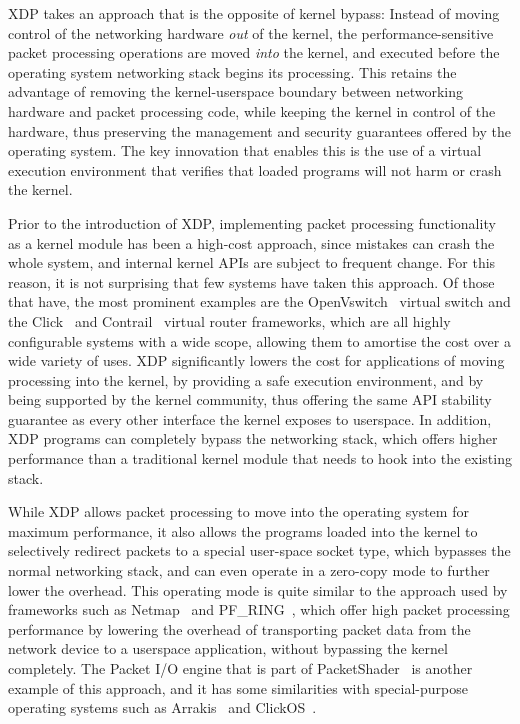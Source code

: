 \documentclass[sigconf]{acmart}
\begin{document}
XDP takes an approach that is the opposite of kernel bypass: Instead of moving
control of the networking hardware \emph{out} of the kernel, the
performance-sensitive packet processing operations are moved \emph{into} the
kernel, and executed before the operating system networking stack begins its
processing. This retains the advantage of removing the kernel-userspace boundary
between networking hardware and packet processing code, while keeping the kernel
in control of the hardware, thus preserving the management and security
guarantees offered by the operating system. The key innovation that enables this
is the use of a virtual execution environment that verifies that loaded programs
will not harm or crash the kernel.

Prior to the introduction of XDP, implementing packet processing functionality
as a kernel module has been a high-cost approach, since mistakes can crash the
whole system, and internal kernel APIs are subject to frequent change. For this
reason, it is not surprising that few systems have taken this approach. Of those
that have, the most prominent examples are the OpenVswitch~\cite{openvswitch}
virtual switch and the Click~\cite{morris1999click} and Contrail~\cite{contrail}
virtual router frameworks, which are all highly configurable systems with a wide
scope, allowing them to amortise the cost over a wide variety of uses. XDP
significantly lowers the cost for applications of moving processing into the
kernel, by providing a safe execution environment, and by being supported by the
kernel community, thus offering the same API stability guarantee as every other
interface the kernel exposes to userspace. In addition, XDP programs can
completely bypass the networking stack, which offers higher performance than a
traditional kernel module that needs to hook into the existing stack.

While XDP allows packet processing to move into the operating system for maximum
performance, it also allows the programs loaded into the kernel to selectively
redirect packets to a special user-space socket type, which bypasses the normal
networking stack, and can even operate in a zero-copy mode to further lower the
overhead. This operating mode is quite similar to the approach used by
frameworks such as Netmap~\cite{rizzo2012netmap} and
PF\_RING~\cite{deri2009modern}, which offer high packet processing performance
by lowering the overhead of transporting packet data from the network device to
a userspace application, without bypassing the kernel completely. The Packet I/O
engine that is part of PacketShader~\cite{han2010packetshader} is another
example of this approach, and it has some similarities with special-purpose
operating systems such as Arrakis~\cite{peter2016arrakis} and
ClickOS~\cite{martins2014clickos}.
\end{document}
